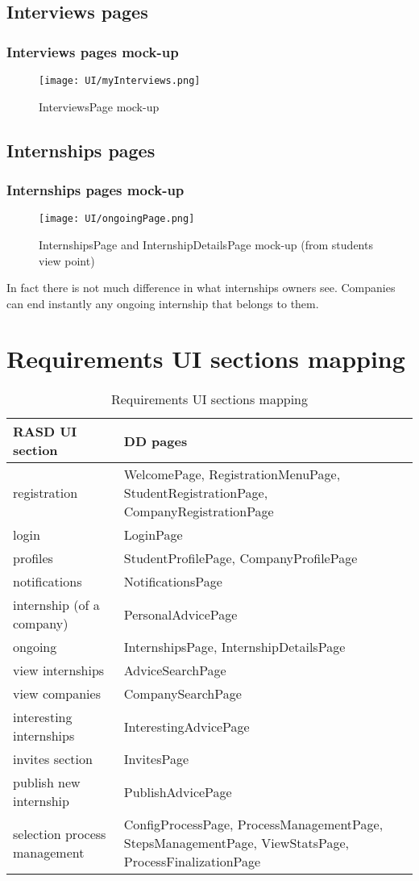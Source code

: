 	\subsection{Interviews pages}
	\subsubsection{Interviews pages mock-up}
	\begin{figure}[H]
		\centering
		\caption{InterviewsPage mock-up}
		\texttt{[image: UI/myInterviews.png]}
	\end{figure}
	\subsection{Internships pages}
	\subsubsection{Internships pages mock-up}
	\begin{figure}[H]
		\centering
		\caption{InternshipsPage and InternshipDetailsPage mock-up (from students view point)}
		\texttt{[image: UI/ongoingPage.png]}
	\end{figure}
	In fact there is not much difference in what internships owners see. Companies can end instantly any ongoing internship that belongs to them.
	\section{Requirements UI sections mapping}
		\begin{table}[H]
			\begin{tabular}{ | m{3cm} | m{3cm} | } 
				\hline
					\textbf {RASD UI section} & \textbf{DD pages} \\
				\hline
					registration & WelcomePage, RegistrationMenuPage, StudentRegistrationPage, CompanyRegistrationPage\\
				\hline
					login & LoginPage\\
				\hline
					profiles & StudentProfilePage, CompanyProfilePage \\
				\hline
					notifications & NotificationsPage\\
				\hline
					internship (of a company) & PersonalAdvicePage\\
				\hline
					ongoing & InternshipsPage, InternshipDetailsPage\\
				\hline
					view internships & AdviceSearchPage\\
				\hline
					view companies & CompanySearchPage\\
				\hline
					interesting internships & InterestingAdvicePage\\
				\hline
					invites section & InvitesPage\\
				\hline
					publish new internship & PublishAdvicePage\\
				\hline
					selection process management & ConfigProcessPage, ProcessManagementPage, StepsManagementPage, ViewStatsPage, ProcessFinalizationPage \\
				\hline
			\end{tabular}
			\caption{Requirements UI sections mapping}
		\end{table}